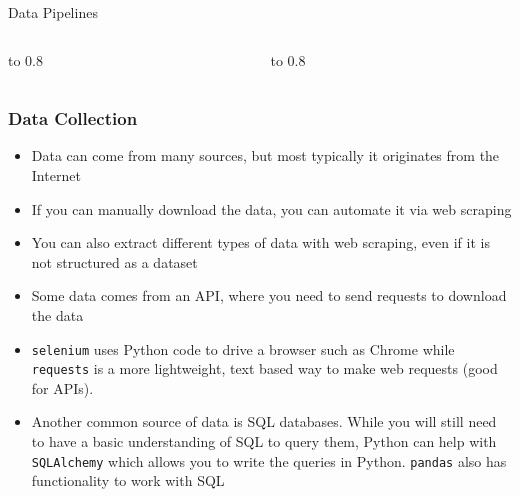 \documentclass[handout, 11pt]{beamer}
\begin{document}
\begin{section}{Data Pipelines}
\begin{frame}
\begin{columns}
\begin{column}{0.5\textwidth}
\vbox to 0.8
\end{column}
\begin{column}{0.5\textwidth}
\vbox to 0.8
\end{column}
\end{columns}
\end{frame}
\begin{frame}
\frametitle{Data Collection}
\begin{itemize}
\small
\vfill
\item Data can come from many sources, but most typically it originates from the Internet
\vfill
\item If you can manually download the data, you can automate it via web scraping
\vfill
\item You can also extract different types of data with web scraping, even if it is not structured as a dataset
\vfill
\item Some data comes from an API, where you need to send requests to download the data
\vfill
\item \texttt{selenium}
uses Python code to drive a browser such as Chrome while
\texttt{requests}
is a more lightweight, text based way to make web requests (good for APIs).
\vfill
\item Another common source of data is SQL databases. While you will still need to have a basic understanding of SQL to query them, Python can help with
\texttt{SQLAlchemy}
which allows
you to write the queries in Python.
\texttt{pandas}
also has functionality to work with SQL
\end{itemize}
\end{frame}

\end{section}
\end{document}
